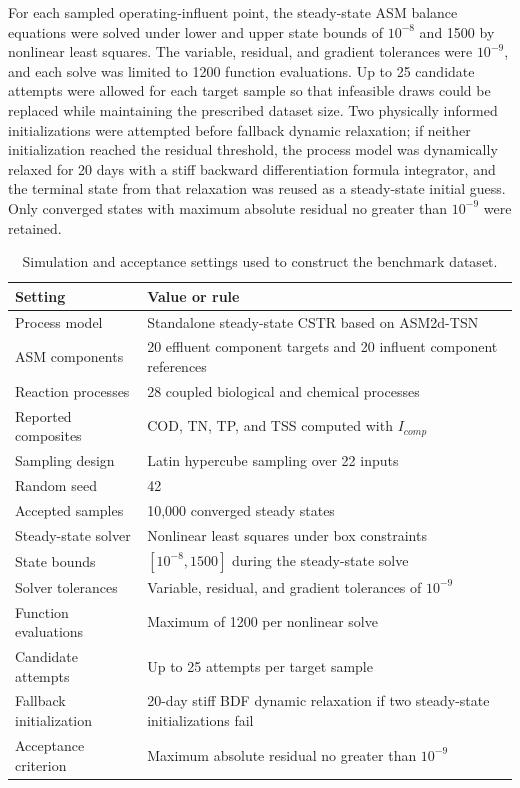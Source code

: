 \documentclass[a4paper,fleqn]{cas-sc}
\begin{document}
For each sampled operating-influent point, the steady-state ASM balance equations were solved under lower and upper state bounds of $10^{-8}$ and 1500 by nonlinear least squares. The variable, residual, and gradient tolerances were $10^{-9}$, and each solve was limited to 1200 function evaluations. Up to 25 candidate attempts were allowed for each target sample so that infeasible draws could be replaced while maintaining the prescribed dataset size. Two physically informed initializations were attempted before fallback dynamic relaxation; if neither initialization reached the residual threshold, the process model was dynamically relaxed for 20 days with a stiff backward differentiation formula integrator, and the terminal state from that relaxation was reused as a steady-state initial guess. Only converged states with maximum absolute residual no greater than $10^{-9}$ were retained.

\begin{table}[htbp]
\centering
\caption{Simulation and acceptance settings used to construct the benchmark dataset.}
\label{tab:simulation_settings}
\scriptsize
\begin{tabular}{p{3.7cm}p{7.2cm}}
\hline
Setting & Value or rule \\
\hline
Process model & Standalone steady-state CSTR based on ASM2d-TSN \\
ASM components & 20 effluent component targets and 20 influent component references \\
Reaction processes & 28 coupled biological and chemical processes \\
Reported composites & COD, TN, TP, and TSS computed with $I_{comp}$ \\
Sampling design & Latin hypercube sampling over 22 inputs \\
Random seed & 42 \\
Accepted samples & 10,000 converged steady states \\
Steady-state solver & Nonlinear least squares under box constraints \\
State bounds & $[10^{-8},1500]$ during the steady-state solve \\
Solver tolerances & Variable, residual, and gradient tolerances of $10^{-9}$ \\
Function evaluations & Maximum of 1200 per nonlinear solve \\
Candidate attempts & Up to 25 attempts per target sample \\
Fallback initialization & 20-day stiff BDF dynamic relaxation if two steady-state initializations fail \\
Acceptance criterion & Maximum absolute residual no greater than $10^{-9}$ \\
\hline
\end{tabular}
\end{table}
\end{document}

